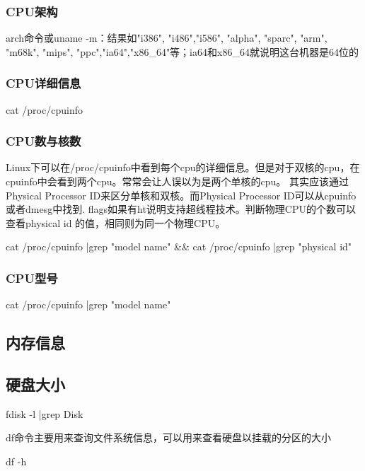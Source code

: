 \subsubsection*{CPU架构}
arch命令或uname -m：结果如"i386", "i486","i586", "alpha", "sparc", "arm", "m68k", 
"mips", "ppc","ia64","x86\_64"等；ia64和x86\_64就说明这台机器是64位的
\subsubsection*{CPU详细信息}
\begin{shellcmd}
cat /proc/cpuinfo
\end{shellcmd}
\subsubsection*{CPU数与核数}
Linux下可以在/proc/cpuinfo中看到每个cpu的详细信息。但是对于双核的cpu，在cpuinfo中会看到两个cpu。常常会让人误以为是两个单核的cpu。
其实应该通过Physical Processor ID来区分单核和双核。而Physical Processor ID可以从cpuinfo或者dmesg中找到.
flags如果有ht说明支持超线程技术。判断物理CPU的个数可以查看physical id 的值，相同则为同一个物理CPU。
\begin{shellcmd}
 cat /proc/cpuinfo |grep "model name" && cat /proc/cpuinfo |grep "physical id"
\end{shellcmd}
\subsubsection*{CPU型号}
\begin{shellcmd}
cat /proc/cpuinfo |grep "model name"
\end{shellcmd}

\subsection*{内存信息}

\subsection*{硬盘大小}
\begin{shellcmd}
fdisk -l |grep Disk
\end{shellcmd}
df命令主要用来查询文件系统信息，可以用来查看硬盘以挂载的分区的大小
\begin{shellcmd}
df -h
\end{shellcmd}

